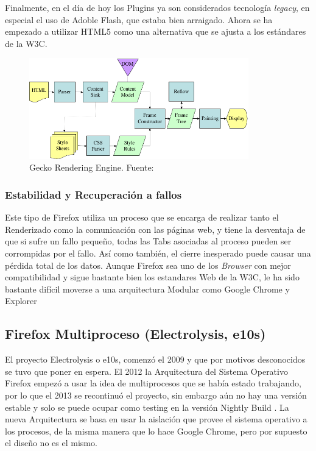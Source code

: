         Finalmente, en el día de hoy los Plugins ya son considerados tecnología \textit{legacy}, en especial el uso de Adoble Flash, que estaba bien arraigado. Ahora se ha empezado a utilizar HTML5 como una alternativa que se ajusta a los estándares de la W3C.

        \begin{figure}[h!t]
            \centering
            \includegraphics[width=0.85\textwidth]{figures/Gecko_Overview_9.png}
            \caption{Gecko Rendering Engine. Fuente: \cite{gecko}}
            \label{fig:Gecko}
        \end{figure}

        \subsubsection{Estabilidad y Recuperación a fallos}
        Este tipo de Firefox utiliza un proceso que se encarga de realizar tanto el Renderizado como la comunicación con las páginas web, y tiene la desventaja de que si sufre un fallo pequeño, todas las Tabs asociadas al proceso pueden ser corrompidas por el fallo. Así como también, el cierre inesperado puede causar una pérdida total de los datos. Aunque Firefox sea uno de los \textit{Browser} con mejor compatibilidad y sigue bastante bien los estandares Web de la W3C, le ha sido bastante difícil moverse a una arquitectura Modular como Google Chrome y Explorer \cite{ElectrolysisTalk}
        
    \subsection{Firefox Multiproceso (Electrolysis, e10s)} 
    El proyecto Electrolysis o e10s, comenzó el 2009 y que por motivos desconocidos \cite{ElectrolysisTalk} se tuvo que poner en espera. El 2012 la Arquitectura del Sistema Operativo Firefox empezó a usar la idea de multiprocesos que se había estado trabajando, por lo que el 2013 se recontinuó el proyecto, sin embargo aún no hay una versión estable y solo se puede ocupar como testing en la versión Nightly Build \cite{NightlyBuilds}. La nueva Arquitectura se basa en usar la aislación que provee el sistema operativo a los procesos, de la misma manera que lo hace Google Chrome, pero por supuesto el diseño no es el mismo.

